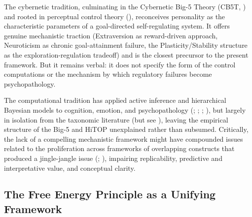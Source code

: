 \documentclass[
  jou,
  floatsintext,
  longtable,
  nolmodern,
  notxfonts,
  notimes,
  12pt,
  colorlinks=true,linkcolor=blue,citecolor=blue,urlcolor=blue]{apa7}
\begin{document}
The cybernetic tradition, culminating in the Cybernetic Big-5 Theory
(CB5T, ) and rooted
in perceptual control theory (), reconceives personality as the characteristic parameters
of a goal-directed self-regulating system. It offers genuine mechanistic
traction (Extraversion as reward-driven approach, Neuroticism as chronic
goal-attainment failure, the Plasticity/Stability structure as the
exploration-regulation tradeoff) and is the closest precursor to the
present framework. But it remains verbal: it does not specify the form
of the control computations or the mechanism by which regulatory
failures become psychopathology.

The computational tradition has applied active inference and
hierarchical Bayesian models to cognition, emotion, and psychopathology
(;
;
;
), but largely in
isolation from the taxonomic literature (but see
), leaving
the empirical structure of the Big-5 and HiTOP unexplained rather than
subsumed. Critically, the lack of a compelling mechanistic framework
might have compounded issues related to the proliferation across
frameworks of overlapping constructs that produced a jingle-jangle issue
(;
), impairing
replicability, predictive and interpretative value, and conceptual
clarity.

\subsection{The Free Energy Principle as a Unifying
Framework}\label{the-free-energy-principle-as-a-unifying-framework}
\end{document}
